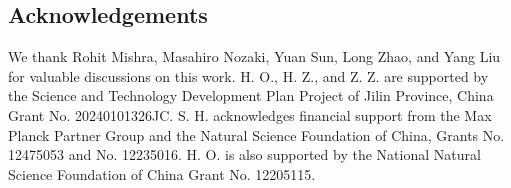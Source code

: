 \documentclass[12pt]{article}
\begin{document}

\subsection*{Acknowledgements}
We thank Rohit Mishra, Masahiro Nozaki, Yuan Sun, Long Zhao, and Yang Liu for valuable discussions on this work.
H. O., H. Z., and Z. Z. are supported by the Science and Technology Development Plan Project of Jilin Province, China Grant No. 20240101326JC.
S. H. acknowledges financial support from the Max Planck Partner Group and the Natural Science Foundation of China, Grants No. 12475053 and No. 12235016. H. O. is also supported by the National Natural Science Foundation of China Grant No. 12205115.


\appendix
\end{document}
